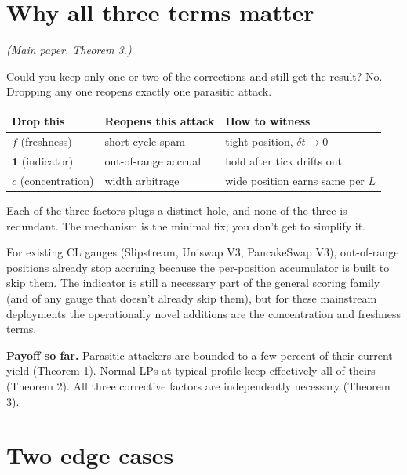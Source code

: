 \documentclass[11pt,a4paper]{article}
\begin{document}
\section{Why all three terms matter}

\emph{(Main paper, Theorem 3.)}

Could you keep only one or two of the corrections and still get the result? No. Dropping any one reopens exactly one parasitic attack.

\begin{result}
\begin{center}
\begin{tabular}{@{}lll@{}}
\toprule
Drop this & Reopens this attack & How to witness \\
\midrule
$f$ (freshness) & short-cycle spam & tight position, $\delta t \to 0$ \\
$\mathbf{1}$ (indicator) & out-of-range accrual & hold after tick drifts out \\
$c$ (concentration) & width arbitrage & wide position earns same per $L$ \\
\bottomrule
\end{tabular}
\end{center}
\end{result}

\begin{intuition}
Each of the three factors plugs a distinct hole, and none of the three is redundant. The mechanism is the minimal fix; you don't get to simplify it.

For existing CL gauges (Slipstream, Uniswap V3, PancakeSwap V3), out-of-range positions already stop accruing because the per-position accumulator is built to skip them. The indicator is still a necessary part of the general scoring family (and of any gauge that doesn't already skip them), but for these mainstream deployments the operationally novel additions are the concentration and freshness terms.
\end{intuition}

\begin{result}
\textbf{Payoff so far.} Parasitic attackers are bounded to a few percent of their current yield (Theorem 1). Normal LPs at typical profile keep effectively all of theirs (Theorem 2). All three corrective factors are independently necessary (Theorem 3).
\end{result}

\section{Two edge cases}
\end{document}
